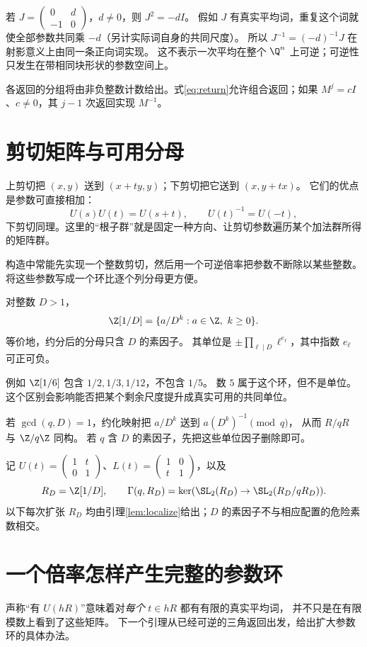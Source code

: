 \begin{example}[两次正向返回提供逆]
若 $J=\left(\begin{smallmatrix}0&d\\-1&0\end{smallmatrix}\right)$，$d\ne0$，则 $J^2=-dI$。
假如 $J$ 有真实平均词，重复这个词就使全部参数共同乘 $-d$（另计实际词自身的共同尺度）。
所以 $J^{-1}=(-d)^{-1}J$ 在射影意义上由同一条正向词实现。
这不表示一次平均在整个 $\Q^n$ 上可逆；可逆性只发生在带相同块形状的参数空间上。
\end{example}

各返回的分组将由非负整数计数给出。式\eqref{eq:return}允许组合返回；如果 $M^j=cI$、$c\ne0$，其 $j-1$ 次返回实现 $M^{-1}$。


\section{剪切矩阵与可用分母}
上剪切把 $(x,y)$ 送到 $(x+ty,y)$；下剪切把它送到 $(x,y+tx)$。
它们的优点是参数可直接相加：
\[
U(s)U(t)=U(s+t),\qquad U(t)^{-1}=U(-t),
\]
下剪切同理。这里的“根子群”就是固定一种方向、让剪切参数遍历某个加法群所得的矩阵群。

构造中常能先实现一个整数剪切，然后用一个可逆倍率把参数不断除以某些整数。
将这些参数写成一个环比逐个列分母更方便。
\begin{definition}[整数的有限局部化]
对整数 $D>1$，
\[
\Z[1/D]=\{a/D^k:a\in\Z,\ k\ge0\}.
\]
等价地，约分后的分母只含 $D$ 的素因子。
其单位是 $\pm\prod_{\ell\mid D}\ell^{e_\ell}$，其中指数 $e_\ell$ 可正可负。
\end{definition}
例如 $\Z[1/6]$ 包含 $1/2,1/3,1/12$，不包含 $1/5$。
数 $5$ 属于这个环，但不是单位。这个区别会影响能否把某个剩余尺度提升成真实可用的共同单位。

若 $\gcd(q,D)=1$，约化映射把 $a/D^k$ 送到 $a(D^k)^{-1}\pmod q$，
从而 $R/qR$ 与 $\Z/q\Z$ 同构。
若 $q$ 含 $D$ 的素因子，先把这些单位因子删除即可。

记 $U(t)=\left(\begin{smallmatrix}1&t\\0&1\end{smallmatrix}\right)$、$L(t)=\left(\begin{smallmatrix}1&0\\t&1\end{smallmatrix}\right)$，以及
\[
R_D=\Z[1/D],\qquad
\Gamma(q,R_D)=\ker(\SL_2(R_D)\to\SL_2(R_D/qR_D)).
\]
以下每次扩张 $R_D$ 均由引理\ref{lem:localize}给出；$D$ 的素因子不与相应配置的危险素数相交。


\section{一个倍率怎样产生完整的参数环}
声称“有 $U(hR)$”意味着对\emph{每个} $t\in hR$ 都有有限的真实平均词，
并不只是在有限模数上看到了这些矩阵。
下一个引理从已经可逆的三角返回出发，给出扩大参数环的具体办法。

